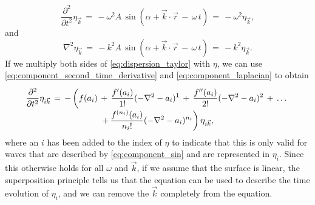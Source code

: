 %
\begin{equation} \label{eq:component_second_time_derivative}
\frac{\partial^2}{\partial t^2}\eta_{\vec{k}} \,=\, -\omega^2 A\,\sin(\alpha + \vec{k}\cdot\vec{r}\,-\,\omega\,t) \,=\, -\omega^2\eta_{\vec{k}},
\end{equation}
%
and 
%
\begin{equation} \label{eq:component_laplacian}
\nabla^2\eta_{\vec{k}} \,=\, -k^2 A\,\sin(\alpha + \vec{k}\cdot\vec{r}\,-\,\omega\,t) \,=\, -k^2\eta_{\vec{k}}.
\end{equation}
%
If we multiply both sides of \eqref{eq:dispersion_taylor} with $\eta$, we can use \eqref{eq:component_second_time_derivative} and \eqref{eq:component_laplacian} to obtain
%
\begin{equation} \label{eq:taylor_pde}
\renewcommand*{\arraystretch}{2}
\begin{array}{c}
\displaystyle \frac{\partial^2}{\partial t^2}\eta_{i\vec{k}} \,=\, -\left(f(a_i) \,+\, \frac{f'(a_i)}{1!}(-\nabla^2-a_i)^1 \,+\, \frac{f''(a_i)}{2!}(-\nabla^2-a_i)^2 \,+\, \dots \right.\\
\displaystyle \left. +\, \frac{f^{(n_i)}(a_i)}{n_i!}(-\nabla^2-a_i)^{n_i}\right)\eta_{i\vec{k}},
\end{array}
\end{equation}
%
where an $i$ has been added to the index of $\eta$ to indicate that this \PDE is only valid for waves that are described by \eqref{eq:component_sin} and are represented in $\eta_i$. Since this \PDE otherwise holds for all $\omega$ and $\vec{k}$, if we assume that the surface is linear, the superposition principle tells us that the equation can be used to describe the time evolution of $\eta_i$, and we can remove the $\vec{k}$ completely from the equation.

